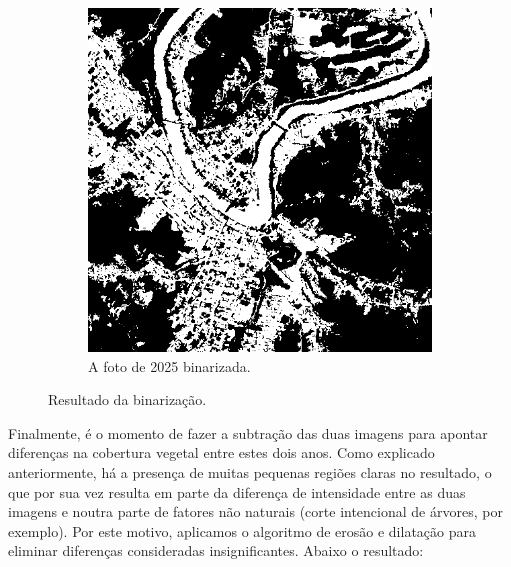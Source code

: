 \documentclass{article}
\begin{document}
\begin{figure}[H]
\begin{subfigure}[b]{0.48\textwidth}
        \includegraphics[width=\textwidth]{../Imagens/012025_bin.png}
        \caption{A foto de 2025 binarizada.}
        \label{2025}
    \end{subfigure}
    \caption{Resultado da binarização.}
    \label{binarizada}
\end{figure}

Finalmente, é o momento de fazer a subtração das duas imagens para apontar diferenças na cobertura vegetal entre estes dois anos. Como explicado anteriormente, há a presença de muitas pequenas regiões claras no resultado, o que por sua vez resulta em parte da diferença de intensidade entre as duas imagens e noutra parte de fatores não naturais (corte intencional de árvores, por exemplo). Por este motivo, aplicamos o algoritmo de erosão e dilatação para eliminar diferenças consideradas insignificantes. Abaixo o resultado:
\end{document}
